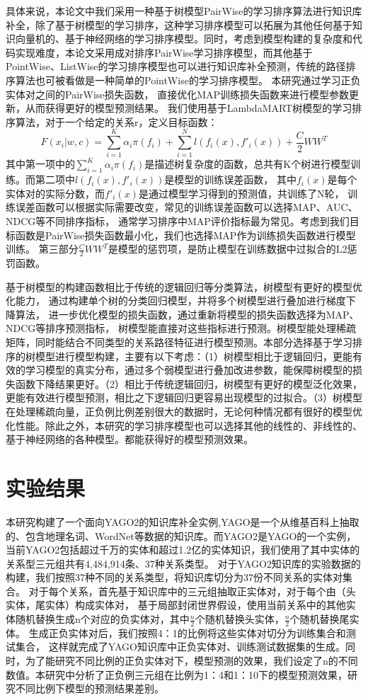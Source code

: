 具体来说，本论文中我们采用一种基于树模型PairWise的学习排序算法进行知识库补全，除了基于树模型的学习排序，这种学习排序模型可以拓展为其他任何基于知识向量机的、基于神经网络的学习排序模型。同时，考虑到模型构建的复杂度和代码实现难度，本论文采用成对排序PairWise学习排序模型，而其他基于PointWise、ListWise的学习排序模型也可以进行知识库补全预测，传统的路径排序算法也可被看做是一种简单的PointWise的学习排序模型。
本研究通过学习正负实体对之间的PairWise损失函数，
直接优化MAP训练损失函数来进行模型参数更新，从而获得更好的模型预测结果。
我们使用基于LambdaMART树模型的学习排序算法，对于一个给定的关系r，定义目标函数：
$$F(x_i|w,c)=\sum_{i=1}^K\alpha_i\pi(f_i)+\sum_{i=1}^Nl(f_i(x),f'_i(x))+\frac{C}{2}WW^T$$
其中第一项中的$\sum_{i=1}^K\alpha_i\pi(f_i)$是描述树复杂度的函数，总共有K个树进行模型训练。而第二项中$l(f_i(x),f'_i(x))$是模型的训练误差函数，
其中$f_i (x)$是每个实体对的实际分数，而$f'_i(x)$是通过模型学习得到的预测值，共训练了N轮，
训练误差函数可以根据实际需要改变，常见的训练误差函数可以选择MAP、AUC、NDCG等不同排序指标，
通常学习排序中MAP评价指标最为常见。考虑到我们目标函数是PairWise损失函数最小化，我们也选择MAP作为训练损失函数进行模型训练。
第三部分$\frac{C}{2}WW^T$是模型的惩罚项，是防止模型在训练数据中过拟合的L2惩罚函数。

基于树模型的构建函数相比于传统的逻辑回归等分类算法，树模型有更好的模型优化能力，
通过构建单个树的分类回归模型，并将多个树模型进行叠加进行梯度下降算法，
进一步优化模型的损失函数，通过重新将模型的损失函数选择为MAP、NDCG等排序预测指标，
树模型能直接对这些指标进行预测。树模型能处理稀疏矩阵，同时能结合不同类型的关系路径特征进行模型预测。本部分选择基于学习排序的树模型进行模型构建，主要有以下考虑：（1）树模型相比于逻辑回归，更能有效的学习模型的真实分布，通过多个弱模型进行叠加改进参数，能保障树模型的损失函数下降结果更好。（2）相比于传统逻辑回归，树模型有更好的模型泛化效果，更能有效进行模型预测，相比之下逻辑回归更容易出现模型的过拟合。（3）树模型在处理稀疏向量，正负例比例差别很大的数据时，无论何种情况都有很好的模型优化性能。除此之外，本研究的学习排序模型也可以选择其他的线性的、非线性的、基于神经网络的各种模型。都能获得好的模型预测效果。

\section{实验结果}
\label{cha:exp-relational}

本研究构建了一个面向YAGO2的知识库补全实例,YAGO是一个从维基百科上抽取的、包含地理名词、WordNet等数据的知识库。而YAGO2是YAGO的一个实例，
当前YAGO2包括超过千万的实体和超过1.2亿的实体知识，我们使用了其中实体的关系型三元组共有4,484,914条、37种关系类型。
对于YAGO2知识库的实验数据的构建，我们按照37种不同的关系类型，将知识库切分为37份不同关系的实体对集合。
对于每个关系，首先基于知识库中的三元组抽取正实体对，对于每个由（头实体，尾实体）构成实体对，
基于局部封闭世界假设，使用当前关系中的其他实体随机替换生成n个对应的负实体对，其中$\frac{n}{2}$个随机替换头实体，$\frac{n}{2}$个随机替换尾实体。
生成正负实体对后，我们按照4：1的比例将这些实体对切分为训练集合和测试集合，
这样就完成了YAGO知识库中正负实体对、训练测试数据集的生成。同时，为了能研究不同比例的正负实体对下，模型预测的效果，我们设定了n的不同数值。本研究中分析了正负例三元组在比例为1：4和1：10下的模型预测效果，研究不同比例下模型的预测结果差别。

